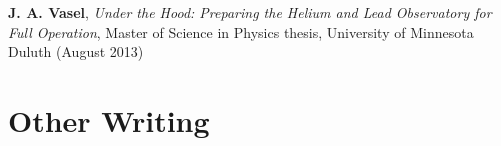 \documentclass{cv}
\begin{document}
\begin{resume}
\textbf{J. A. Vasel}, \emph{Under the Hood: Preparing the Helium and Lead Observatory for Full Operation}, Master of Science in Physics thesis, University of Minnesota Duluth (August 2013)
\itemSep

% 
% 
% 
% 
% 
% 
% 
% 



\section{Other Writing}

\vspace{-0.21in}

\end{resume}
\end{document}
